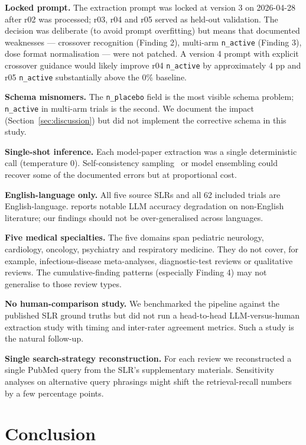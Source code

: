 \documentclass[a4paper,fleqn]{cas-sc}
\begin{document}
\textbf{Locked prompt.} The extraction prompt was locked at version 3 on
2026-04-28 after r02 was processed; r03, r04 and r05 served as
held-out validation. The decision was deliberate (to avoid prompt
overfitting) but means that documented weaknesses --- crossover
recognition (Finding 2), multi-arm \texttt{n\_active} (Finding 3), dose
format normalisation --- were not patched. A version 4 prompt with
explicit crossover guidance would likely improve r04 \texttt{n\_active}
by approximately 4 pp and r05 \texttt{n\_active} substantially above the
0\% baseline.

\textbf{Schema misnomers.} The \texttt{n\_placebo} field is the most
visible schema problem; \texttt{n\_active} in multi-arm trials is the
second. We document the impact (Section~\ref{sec:discussion}) but did
not implement the corrective schema in this study.

\textbf{Single-shot inference.} Each model-paper extraction was a single
deterministic call (temperature 0). Self-consistency
sampling~\citep{wang2023selfconsistency} or model ensembling could
recover some of the documented errors but at proportional cost.

\textbf{English-language only.} All five source SLRs and all 62
included trials are English-language. \citet{khraisha2024llmsr}
reports notable LLM accuracy degradation on non-English literature;
our findings should not be over-generalised across languages.

\textbf{Five medical specialties.} The five domains span pediatric
neurology, cardiology, oncology, psychiatry and respiratory medicine.
They do not cover, for example, infectious-disease meta-analyses,
diagnostic-test reviews or qualitative reviews. The cumulative-finding
patterns (especially Finding 4) may not generalise to those review
types.

\textbf{No human-comparison study.} We benchmarked the pipeline against
the published SLR ground truths but did not run a head-to-head
LLM-versus-human extraction study with timing and inter-rater agreement
metrics. Such a study is the natural follow-up.

\textbf{Single search-strategy reconstruction.} For each review we
reconstructed a single PubMed query from the SLR's supplementary
materials. Sensitivity analyses on alternative query phrasings might
shift the retrieval-recall numbers by a few percentage points.

\section{Conclusion}\label{sec:conclusion}
\end{document}
